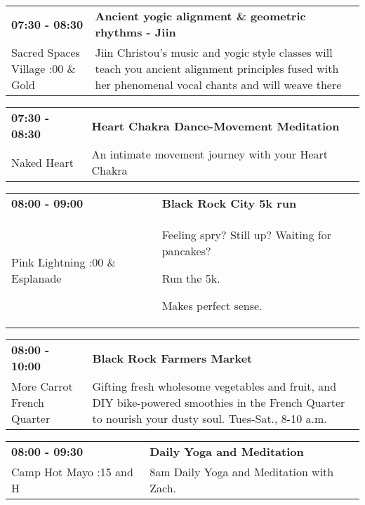 \begin{tabular}{ p{1in} p{2.2in} }
    \textbf{07:30 - 08:30} & \textbf{Ancient yogic alignment \& geometric rhythms - Jiin} \\
    Sacred Spaces Village \newline 4:00 \& Gold & Jiin Christou's  music and yogic style classes will teach you ancient alignment principles fused with her phenomenal vocal chants and will weave there \\
    \hline 
\end{tabular}
    
\begin{tabular}{ p{1in} p{2.2in} }
    \textbf{07:30 - 08:30} & \textbf{Heart Chakra Dance-Movement Meditation} \\
    Naked Heart \newline  & An intimate movement journey with your Heart Chakra \\
    \hline 
\end{tabular}
    
\begin{tabular}{ p{1in} p{2.2in} }
    \textbf{08:00 - 09:00} & \textbf{Black Rock City 5k run} \\
    Pink Lightning \newline 6:00 \& Esplanade & Feeling spry?  Still up?  Waiting for pancakes?

Run the 5k.  

Makes perfect sense. \\
    \hline 
\end{tabular}
    
\begin{tabular}{ p{1in} p{2.2in} }
    \textbf{08:00 - 10:00} & \textbf{Black Rock Farmers Market} \\
    More Carrot \newline French Quarter & Gifting fresh wholesome vegetables and fruit, and DIY bike-powered smoothies in the French Quarter to nourish your dusty soul. Tues-Sat., 8-10 a.m. \\
    \hline 
\end{tabular}
    
\begin{tabular}{ p{1in} p{2.2in} }
    \textbf{08:00 - 09:30} & \textbf{Daily Yoga and Meditation} \\
    Camp Hot Mayo \newline 9:15 and H & 8am Daily Yoga and Meditation with Zach. \\
    \hline 
\end{tabular}
    

